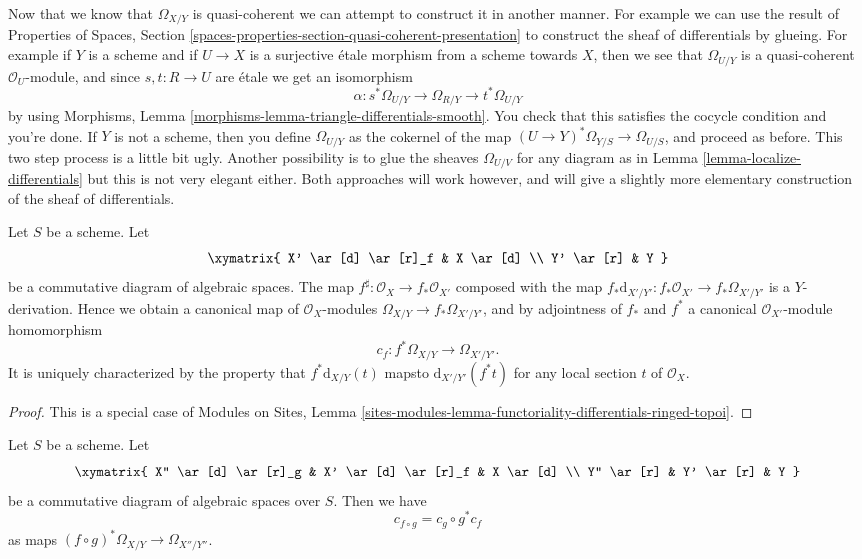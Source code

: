 \begin{remark}
\label{remark-alternative}
Now that we know that $\Omega_{X/Y}$ is quasi-coherent we can attempt
to construct it in another manner. For example we can use the result of
Properties of Spaces,
Section \ref{spaces-properties-section-quasi-coherent-presentation}
to construct the sheaf of differentials by glueing.
For example if $Y$ is a scheme and if $U \to X$ is a surjective \'etale morphism
from a scheme towards $X$, then we see that $\Omega_{U/Y}$ is
a quasi-coherent $\mathcal{O}_U$-module, and since $s, t : R \to U$
are \'etale we get an isomorphism
$$
\alpha : s^*\Omega_{U/Y} \to \Omega_{R/Y} \to t^*\Omega_{U/Y}
$$
by using
Morphisms, Lemma \ref{morphisms-lemma-triangle-differentials-smooth}.
You check that this satisfies the cocycle condition and you're done.
If $Y$ is not a scheme, then you define $\Omega_{U/Y}$ as the cokernel
of the map $(U \to Y)^*\Omega_{Y/S} \to \Omega_{U/S}$, and proceed as
before. This two step process is a little bit ugly. Another possibility
is to glue the sheaves $\Omega_{U/V}$ for any diagram as in
Lemma \ref{lemma-localize-differentials}
but this is not very elegant either. Both approaches will work however, and
will give a slightly more elementary construction of the sheaf of
differentials.
\end{remark}

\begin{lemma}
\label{lemma-functoriality-differentials}
Let $S$ be a scheme. Let
$$
\xymatrix{
X' \ar[d] \ar[r]_f & X \ar[d] \\
Y' \ar[r] & Y
}
$$
be a commutative diagram of algebraic spaces. The map
$f^\sharp : \mathcal{O}_X \to f_*\mathcal{O}_{X'}$ composed with the map
$f_*\text{d}_{X'/Y'} : f_*\mathcal{O}_{X'} \to f_*\Omega_{X'/Y'}$ is a
$Y$-derivation. Hence we obtain a canonical map of $\mathcal{O}_X$-modules
$\Omega_{X/Y} \to f_*\Omega_{X'/Y'}$, and by
adjointness of $f_*$ and $f^*$ a
canonical $\mathcal{O}_{X'}$-module homomorphism
$$
c_f : f^*\Omega_{X/Y} \longrightarrow \Omega_{X'/Y'}.
$$
It is uniquely characterized by the property that
$f^*\text{d}_{X/Y}(t)$ mapsto $\text{d}_{X'/Y'}(f^* t)$
for any local section $t$ of $\mathcal{O}_X$.
\end{lemma}

\begin{proof}
This is a special case of
Modules on Sites, Lemma
\ref{sites-modules-lemma-functoriality-differentials-ringed-topoi}.
\end{proof}

\begin{lemma}
\label{lemma-check-functoriality-differentials}
Let $S$ be a scheme. Let
$$
\xymatrix{
X'' \ar[d] \ar[r]_g & X' \ar[d] \ar[r]_f & X \ar[d] \\
Y'' \ar[r] & Y' \ar[r] & Y
}
$$
be a commutative diagram of algebraic spaces over $S$. Then we have
$$
c_{f \circ g} = c_g \circ g^* c_f
$$
as maps $(f \circ g)^*\Omega_{X/Y} \to \Omega_{X''/Y''}$.
\end{lemma}

